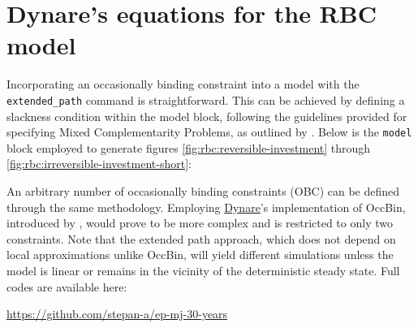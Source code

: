 \documentclass[a4paper,11pt]{amsart}
\newcommand{\Dynare}{\href{http://www.dynare.org}{Dynare}}
\begin{document}
\section{Dynare's equations for the RBC model}\label{appendix:rbc-mod}

Incorporating an occasionally binding constraint into a model
with the \verb+extended_path+ command is straightforward. This
can be achieved by defining a slackness condition within the model
block, following the guidelines provided for specifying Mixed
Complementarity Problems, as outlined by
\textcite{DynareManual}. Below is the \verb+model+ block employed to
generate figures \ref{fig:rbc:reversible-investment} through
\ref{fig:rbc:irreversible-investment-short}:



An arbitrary number of occasionally binding constraints (OBC) can be
defined through the same methodology. Employing \Dynare's
implementation of OccBin, introduced by \textcite{OccBin}, would prove
to be more complex and is restricted to only two constraints. Note
that the extended path approach, which does not depend on local
approximations unlike OccBin, will yield different simulations unless
the model is linear or remains in the vicinity of the deterministic
steady state. Full codes are available here:
\begin{center}
   \url{https://github.com/stepan-a/ep-mj-30-years}
\end{center}

\newpage

\printbibliography
\end{document}
